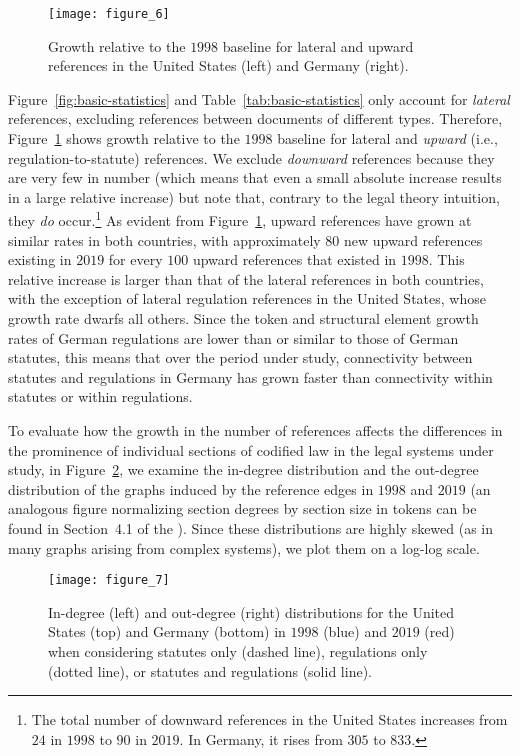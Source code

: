 \begin{figure}
	\centering
	\texttt{[image: figure\_6]}
	\caption{Growth relative to the $1998$ baseline for lateral and upward references in the United States (left) and Germany (right).}\label{fig:crossref-evolution}
\end{figure}

Figure~\ref{fig:basic-statistics} and Table~\ref{tab:basic-statistics} only account for \emph{lateral} references, excluding references between documents of different types. 
Therefore, Figure~\ref{fig:crossref-evolution} shows growth relative to the $1998$ baseline for lateral and \emph{upward} (i.e., regulation-to-statute) references. 
We exclude \emph{downward} references because they are very few in number (which means that even a small absolute increase results in a large relative increase) 
but note that, contrary to the legal theory intuition, they \emph{do} occur.\footnote{%
The total number of downward references in the United States increases from $24$ in $1998$ to $90$ in $2019$.
In Germany, it rises from $305$ to $833$.
}
As evident from Figure~\ref{fig:crossref-evolution}, upward references have grown at similar rates in both countries, with approximately $80$ new upward references existing in $2019$ for every $100$ upward references that existed in $1998$. 
This relative increase is larger than that of the lateral references in both countries, with the exception of lateral regulation references in the United States, whose growth rate dwarfs all others. 
Since the token and structural element growth rates of German regulations are lower than or similar to those of German statutes, this means that over the period under study, connectivity between statutes and regulations in Germany has grown faster than connectivity within statutes or within regulations. 

To evaluate how the growth in the number of references affects the differences in the prominence of individual sections of codified law in the legal systems under study, in Figure~\ref{fig:degree-distribution}, we examine the in-degree distribution and the out-degree distribution of the graphs induced by the reference edges in $1998$ and $2019$ (an analogous figure normalizing section degrees by section size in tokens can be found in Section~4.1 of the \thesi).  
Since these distributions are highly skewed (as in many graphs arising from complex systems), we plot them on a log-log scale. 

\begin{figure}
	\centering
	\texttt{[image: figure\_7]}
	\caption{In-degree (left) and out-degree (right) distributions for the United States (top) and Germany (bottom) in $1998$ (blue) and $2019$ (red) when considering statutes only (dashed line), regulations only (dotted line), or statutes and regulations (solid line).}\label{fig:degree-distribution}
\end{figure}

